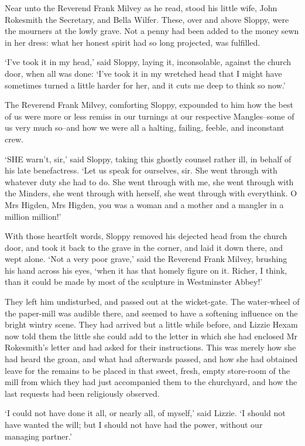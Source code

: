 Near unto the Reverend Frank Milvey as he read, stood his little wife,
John Rokesmith the Secretary, and Bella Wilfer. These, over and above
Sloppy, were the mourners at the lowly grave. Not a penny had been
added to the money sewn in her dress: what her honest spirit had so long
projected, was fulfilled.

‘I’ve took it in my head,’ said Sloppy, laying it, inconsolable, against
the church door, when all was done: ‘I’ve took it in my wretched head
that I might have sometimes turned a little harder for her, and it cuts
me deep to think so now.’

The Reverend Frank Milvey, comforting Sloppy, expounded to him how the
best of us were more or less remiss in our turnings at our respective
Mangles--some of us very much so--and how we were all a halting,
failing, feeble, and inconstant crew.

‘SHE warn’t, sir,’ said Sloppy, taking this ghostly counsel rather ill,
in behalf of his late benefactress. ‘Let us speak for ourselves, sir.
She went through with whatever duty she had to do. She went through with
me, she went through with the Minders, she went through with herself,
she went through with everythink. O Mrs Higden, Mrs Higden, you was a
woman and a mother and a mangler in a million million!’

With those heartfelt words, Sloppy removed his dejected head from the
church door, and took it back to the grave in the corner, and laid it
down there, and wept alone. ‘Not a very poor grave,’ said the Reverend
Frank Milvey, brushing his hand across his eyes, ‘when it has that
homely figure on it. Richer, I think, than it could be made by most of
the sculpture in Westminster Abbey!’

They left him undisturbed, and passed out at the wicket-gate. The
water-wheel of the paper-mill was audible there, and seemed to have a
softening influence on the bright wintry scene. They had arrived but a
little while before, and Lizzie Hexam now told them the little she could
add to the letter in which she had enclosed Mr Rokesmith’s letter and
had asked for their instructions. This was merely how she had heard the
groan, and what had afterwards passed, and how she had obtained leave
for the remains to be placed in that sweet, fresh, empty store-room of
the mill from which they had just accompanied them to the churchyard,
and how the last requests had been religiously observed.

‘I could not have done it all, or nearly all, of myself,’ said Lizzie.
‘I should not have wanted the will; but I should not have had the power,
without our managing partner.’

